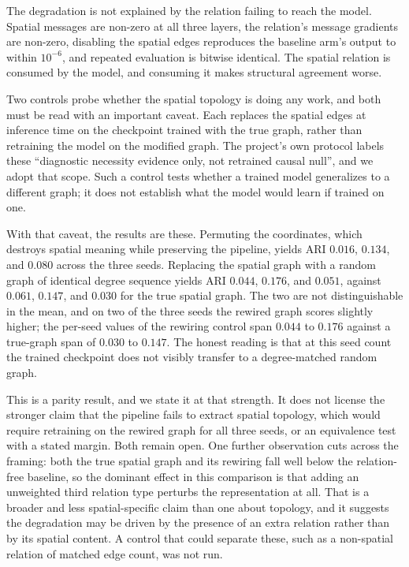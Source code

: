 \documentclass[twocolumn,10pt]{article}
\begin{document}
The degradation is not explained by the relation failing to reach the model. Spatial messages are non-zero at all three layers, the relation's message gradients are non-zero, disabling the spatial edges reproduces the baseline arm's output to within $10^{-6}$, and repeated evaluation is bitwise identical. The spatial relation is consumed by the model, and consuming it makes structural agreement worse.

Two controls probe whether the spatial topology is doing any work, and both must be read with an important caveat. Each replaces the spatial edges at inference time on the checkpoint trained with the true graph, rather than retraining the model on the modified graph. The project's own protocol labels these ``diagnostic necessity evidence only, not retrained causal null'', and we adopt that scope. Such a control tests whether a trained model generalizes to a different graph; it does not establish what the model would learn if trained on one.

With that caveat, the results are these. Permuting the coordinates, which destroys spatial meaning while preserving the pipeline, yields ARI $0.016$, $0.134$, and $0.080$ across the three seeds. Replacing the spatial graph with a random graph of identical degree sequence yields ARI $0.044$, $0.176$, and $0.051$, against $0.061$, $0.147$, and $0.030$ for the true spatial graph. The two are not distinguishable in the mean, and on two of the three seeds the rewired graph scores slightly higher; the per-seed values of the rewiring control span $0.044$ to $0.176$ against a true-graph span of $0.030$ to $0.147$. The honest reading is that at this seed count the trained checkpoint does not visibly transfer to a degree-matched random graph.

This is a parity result, and we state it at that strength. It does not license the stronger claim that the pipeline fails to extract spatial topology, which would require retraining on the rewired graph for all three seeds, or an equivalence test with a stated margin. Both remain open. One further observation cuts across the framing: both the true spatial graph and its rewiring fall well below the relation-free baseline, so the dominant effect in this comparison is that adding an unweighted third relation type perturbs the representation at all. That is a broader and less spatial-specific claim than one about topology, and it suggests the degradation may be driven by the presence of an extra relation rather than by its spatial content. A control that could separate these, such as a non-spatial relation of matched edge count, was not run.
\end{document}
